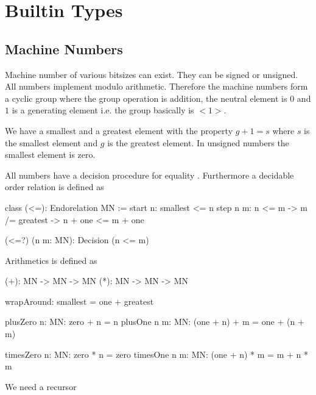 \section{Builtin Types}

\subsection{Machine Numbers}

Machine number of various bitsizes can exist. They can be signed or unsigned.
All numbers implement modulo arithmetic. Therefore the machine numbers form a
cyclic group where the group operation is addition, the neutral element is $0$
and $1$ is a generating element i.e. the group basically is $<1>$.

We have a smallest and a greatest element with the property $g + 1 = s$ where
$s$ is the smallest element and $g$ is the greatest element. In unsigned numbers
the smallest element is zero.

All numbers have a decision procedure for equality . Furthermore a
decidable order relation is defined as

\begin{alba}
    class
        (<=): Endorelation MN
    :=
        start {n}: smallest <= n
        step {n m}:
            n <= m
            -> m /= greatest
            -> n + one <= m + one

    (<=?) (n m: MN): Decision (n <= m)
\end{alba}


Arithmetics is defined as

\begin{alba}
    (+): MN -> MN -> MN
    (*): MN -> MN -> MN

    wrapAround: smallest = one + greatest

    plusZero {n: MN}:   zero + n = n
    plusOne  {n m: MN}: (one + n) + m = one + (n + m)

    timesZero {n: MN}:   zero * n = zero
    timesOne  {n m: MN}: (one + n) * m = m + n * m
\end{alba}


We need a recursor

